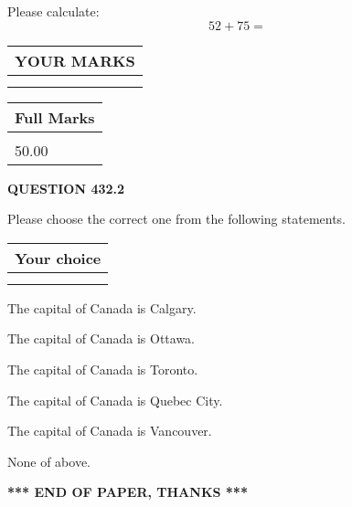 \documentclass[12pt]{article}
\begin{document}
  
 
Please calculate:
\begin{equation}
52 +  %
75 = \nonumber
\end{equation}
 

 

 
  
\vspace{0.2in}
  
\noindent\begin{tabular}{|l|}
\hline
 YOUR MARKS  \\
\hline
 \\ 
 \\ 
\hline
\end{tabular}
\hspace{0.05in} \begin{tabular}{|l|}
\hline
 Full Marks  \\
\hline
 \\ 
50.00 \\
\hline
\end{tabular}
{\textbf{\Large{QUESTION
432.2 
}}}
  
  
Please choose the correct one from the following statements.
  
  
\noindent\hspace{3.0in} \begin{tabular}{|l|}
\hline
Your choice \\
\hline
 \\ 
 \\ 
\hline
\end{tabular}
  
  
 
 
The capital of Canada is Calgary.
 
 
The capital of Canada is Ottawa.
 
 
The capital of Canada is Toronto.
 
 
The capital of Canada is Quebec City.
 
 
The capital of Canada is Vancouver.
 
 
 None of above.
 
 
   
   
 \vspace{0.2in}
 
   
   
   
   
\vspace{1.0in} 
{\textbf{\large{ *** END OF PAPER, THANKS *** }}} 
   
\end{document}
